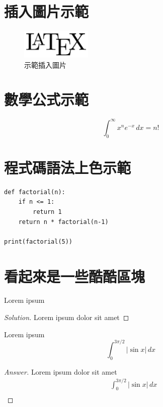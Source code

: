 \documentclass[12pt]{article}
\newenvironment{exercise}[2][Exercise]{\begin{trivlist}
\item[\hskip \labelsep {\bfseries #1}\hskip \labelsep {\bfseries #2.}]}{\end{trivlist}}
\newenvironment{problem}[2][Problem]{\begin{trivlist}
\item[\hskip \labelsep {\bfseries #1}\hskip \labelsep {\bfseries #2.}]}{\end{trivlist}}
\newenvironment{solution}{\begin{proof}[Solution]}{\end{proof}}
\newenvironment{answer}{\begin{proof}[Answer]}{\end{proof}}
\begin{document}
\section{插入圖片示範}
\begin{figure}[ht]
    \centering
    \includegraphics[width=0.3\textwidth]{example.png} %
    \caption{示範插入圖片}
    \label{fig:example}
\end{figure}

\section{數學公式示範}
\[
    \int_{0}^{\infty} x^n e^{-x}\, dx = n!
\]

\section{程式碼語法上色示範}
\begin{verbatim}
def factorial(n):
    if n <= 1:
        return 1
    return n * factorial(n-1)

print(factorial(5))
\end{verbatim}

\section{看起來是一些酷酷區塊}

\begin{problem}{1}
    Lorem ipsum
\end{problem}

\begin{solution}
    Lorem ipsum dolor sit amet
\end{solution}

\begin{exercise}{123}
    Lorem ipsum
    \begin{equation*}
        \int_0^{3\pi/2}|\sin x|\,dx
    \end{equation*}
\end{exercise}

\begin{answer}
    Lorem ipsum dolor sit amet
    \begin{equation*}
        \begin{split}
            &  \int_0^{3\pi/2}|\sin x|\,dx \\
        \end{split}
    \end{equation*}
\end{answer}

\end{document}

